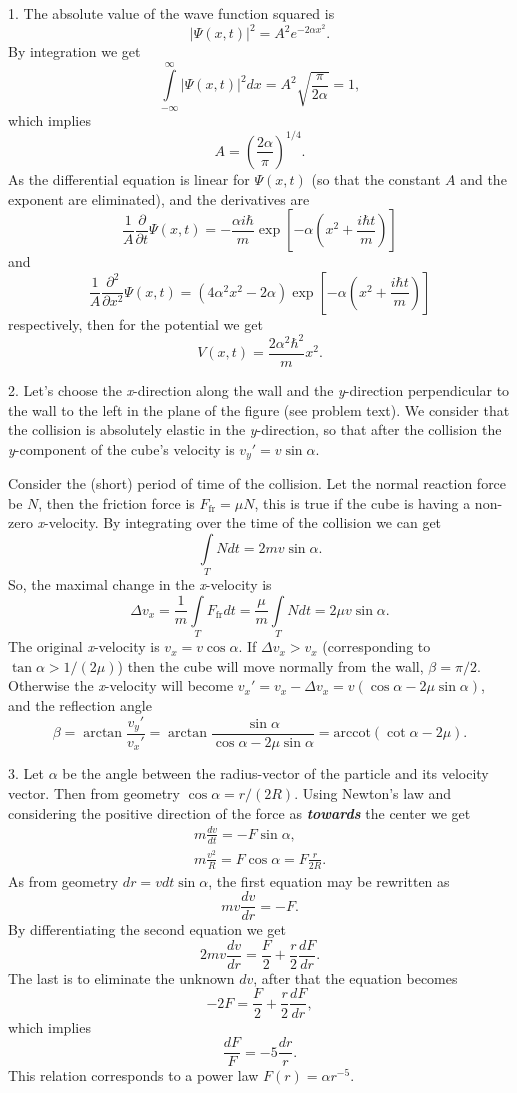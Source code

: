 \documentclass[12pt,a4paper,pdflatex]{disser}
\begin{document}
1. The absolute value of the wave function squared is
$$
  \left|\Psi(x,t)\right|^2=A^2 e^{-2\alpha x^2}.
$$
By integration we get
$$
  \int\limits_{-\infty}^\infty \left|\Psi(x,t)\right|^2 dx=A^2\sqrt{\frac{\pi}{2\alpha}}=1,
$$
which implies
$$
  A=\left(\frac{2\alpha}{\pi}\right)^{1/4}.
$$
As the differential equation is linear for $\Psi(x,t)$ (so that the constant $A$ and the exponent are eliminated), and the derivatives are
$$
  \frac{1}{A}\frac{\partial}{\partial t}\Psi(x,t)=-\frac{\alpha i\hbar}{m}\exp\left[-\alpha\left(x^2+\frac{i\hbar t}{m}\right)\right]
$$
and
$$
  \frac{1}{A}\frac{\partial^2}{\partial x^2}\Psi(x,t)=\left(4\alpha^2 x^2-2\alpha\right)\exp\left[-\alpha\left(x^2+\frac{i\hbar t}{m}\right)\right]
$$
respectively, then for the potential we get
$$
  V(x,t)=\frac{2\alpha^2 \hbar^2}{m}x^2.
$$

2. Let's choose the \textit{x}-direction along the wall and the \textit{y}-direction perpendicular to the wall to the left in the plane of the figure (see problem text). We consider that the collision is absolutely elastic in the \textit{y}-direction, so that after the collision the \textit{y}-component of the cube's velocity is ${v_y '=v\sin\alpha}$.

Consider the (short) period of time of the collision. Let the normal reaction force be $N$, then the friction force is $F_\text{fr}=\mu N$, this is true if the cube is having a non-zero \textit{x}-velocity. By integrating over the time of the collision we can get
$$
  \int\limits_T Ndt=2mv\sin\alpha.
$$
So, the maximal change in the \textit{x}-velocity is
$$
  \Delta v_x=\frac{1}{m}\int\limits_T F_\text{fr}dt=\frac{\mu}{m}\int\limits_T Ndt=2\mu v\sin\alpha.
$$
The original \textit{x}-velocity is $v_x=v\cos\alpha$. If $\Delta v_x>v_x$ (corresponding to $\tan\alpha>1/(2\mu)$) then the cube will move normally from the wall, $\beta=\pi/2$. Otherwise the \textit{x}-velocity will become $v_x '=v_x-\Delta v_x=v(\cos\alpha-2\mu\sin\alpha)$, and the reflection angle
$$
  \beta=\arctan\frac{v_y '}{v_x '}=\arctan\frac{\sin\alpha}{\cos\alpha-2\mu\sin\alpha}=\text{arccot}\left(\cot\alpha-2\mu\right).
$$

3. Let $\alpha$ be the angle between the radius-vector of the particle and its velocity vector. Then from geometry $\cos\alpha=r/(2R)$. Using Newton's law and considering the positive direction of the force as \textit{\textbf{towards}} the center we get
\begin{gather}
  m\frac{dv}{dt}=-F\sin\alpha,\nonumber\\
  m\frac{v^2}{R}=F\cos\alpha=F\frac{r}{2R}.\nonumber
\end{gather}
As from geometry $dr=vdt\sin\alpha$, the first equation may be rewritten as
$$
  mv\frac{dv}{dr}=-F.
$$
By differentiating the second equation we get
$$
  2mv\frac{dv}{dr}=\frac{F}{2}+\frac{r}{2}\frac{dF}{dr}.
$$
The last is to eliminate the unknown $dv$, after that the equation becomes
$$
  -2F=\frac{F}{2}+\frac{r}{2}\frac{dF}{dr},
$$
which implies
$$
  \frac{dF}{F}=-5\frac{dr}{r}.
$$
This relation corresponds to a power law $F(r)=\alpha r^{-5}$.
\end{document}
